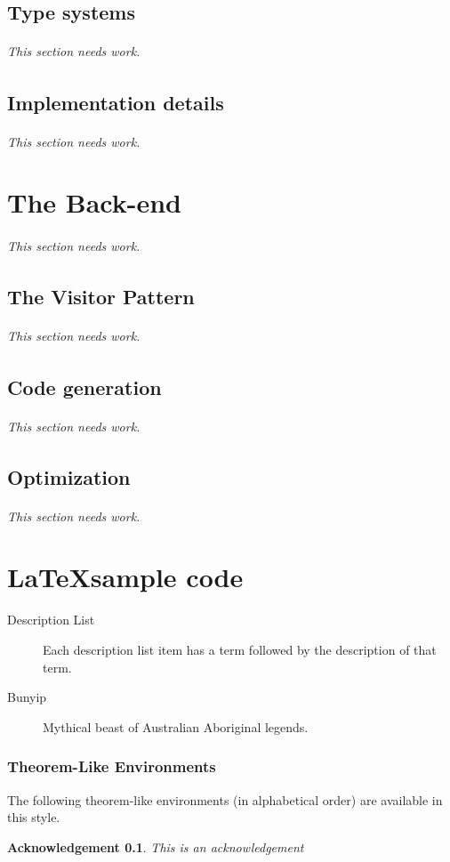 \documentclass[letterpaper,12pt,openany,reqno]{book}%
\newcommand{\needswork}{\paragraph{This section needs work.}}
\newtheorem{acknowledgement}[theorem]{Acknowledgement}
\begin{document}
\chapter {Type systems}
\needswork{}

\chapter {Implementation details}
\needswork{}

\part{The Back-end}
\needswork{}

\chapter {The Visitor Pattern}
\needswork{}

\chapter {Code generation}
\needswork{}

\chapter {Optimization}
\needswork{}

\part {\LaTeX sample code}

\begin{description}
\item[Description List] Each description list item has a term followed by the
description of that term.

\item[Bunyip] Mythical beast of Australian Aboriginal legends.
\end{description}

\section{Theorem-Like Environments}

The following theorem-like environments (in alphabetical order) are available
in this style.

\begin{acknowledgement}
This is an acknowledgement
\end{acknowledgement}
\end{document}
